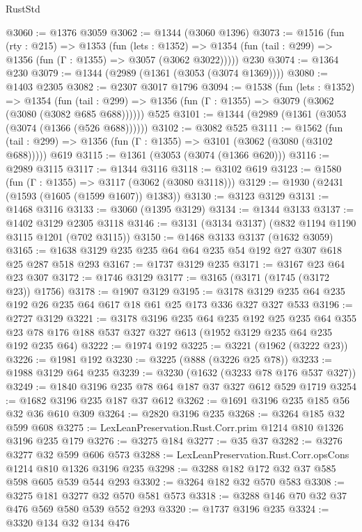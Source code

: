 \begin{lexlean}{RustStd}
\begin{coremodule}
@3060 := @1376 @3059
@3062 := @1344 (@3060 @1396)
@3073 := @1516
    (fun (rty : @215) =>
    @1353
      (fun (lets : @1352) =>
      @1354 (fun (tail : @299) => @1356 (fun (Γ : @1355) => @3057 (@3062 @3022)))))
    @230
@3074 := @1364 @230
@3079 := @1344 (@2989 (@1361 (@3053 (@3074 @1369))))
@3080 := @1403 @2305
@3082 := @2307 @3017 @1796
@3094 := @1538
    (fun (lets : @1352) =>
    @1354 (fun (tail : @299) => @1356 (fun (Γ : @1355) => @3079 (@3062 (@3080 (@3082 @685 @688))))))
    @525
@3101 := @1344 (@2989 (@1361 (@3053 (@3074 (@1366 (@526 @688))))))
@3102 := @3082 @525
@3111 := @1562
    (fun (tail : @299) => @1356 (fun (Γ : @1355) => @3101 (@3062 (@3080 (@3102 @688)))))
    @619
@3115 := @1361 (@3053 (@3074 (@1366 @620)))
@3116 := @2989 @3115
@3117 := @1344 @3116
@3118 := @3102 @619
@3123 := @1580 (fun (Γ : @1355) => @3117 (@3062 (@3080 @3118)))
@3129 := @1930 (@2431 (@1593 (@1605 (@1599 @1607)) @1383))
@3130 := @3123 @3129
@3131 := @1468 @3116
@3133 := @3060 (@1395 @3129)
@3134 := @1344 @3133
@3137 := @1402 @3129 @2305 @3118
@3146 := @3131 (@3134 @3137) (@832 @1194 @1190 @3115 @1201 (@702 @3115))
@3150 := @1468 @3133 @3137 (@1632 @3059)
@3165 := @1638 @3129 @235 @235 @64 @64 @235 @54 @192 @27 @307 @618 @25 @287 @518 @293
@3167 := @1737 @3129 @235
@3171 := @3167 @23 @64 @23 @307
@3172 := @1746 @3129
@3177 := @3165 (@3171 (@1745 (@3172 @23)) @1756)
@3178 := @1907 @3129
@3195 := @3178 @3129 @235 @64 @235 @192 @26 @235 @64 @617 @18 @61 @25 @173 @336 @327 @327 @533
@3196 := @2727 @3129
@3221 := @3178
    @3196
    @235
    @64
    @235
    @192
    @25
    @235
    @64
    @355
    @23
    @78
    @176
    @188
    @537
    @327
    @327
    @613
    (@1952 @3129 @235 @64 @235 @192 @235 @64)
@3222 := @1974 @192
@3225 := @3221 (@1962 (@3222 @23))
@3226 := @1981 @192
@3230 := @3225 (@888 (@3226 @25 @78))
@3233 := @1988 @3129 @64 @235
@3239 := @3230 (@1632 (@3233 @78 @176 @537 @327))
@3249 := @1840 @3196 @235 @78 @64 @187 @37 @327 @612 @529 @1719
@3254 := @1682 @3196 @235 @187 @37 @612
@3262 := @1691 @3196 @235 @185 @56 @32 @36 @610 @309
@3264 := @2820 @3196 @235
@3268 := @3264 @185 @32 @599 @608
@3275 := LexLeanPreservation.Rust.Corr.prim @1214 @810 @1326 @3196 @235 @179
@3276 := @3275 @184
@3277 := @35 @37
@3282 := @3276 @3277 @32 @599 @606 @573
@3288 := LexLeanPreservation.Rust.Corr.opsCons @1214 @810 @1326 @3196 @235
@3298 := @3288 @182 @172 @32 @37 @585 @598 @605 @539 @544 @293
@3302 := @3264 @182 @32 @570 @583
@3308 := @3275 @181 @3277 @32 @570 @581 @573
@3318 := @3288 @146 @70 @32 @37 @476 @569 @580 @539 @552 @293
@3320 := @1737 @3196 @235
@3324 := @3320 @134 @32 @134 @476

\end{coremodule}
\end{lexlean}
